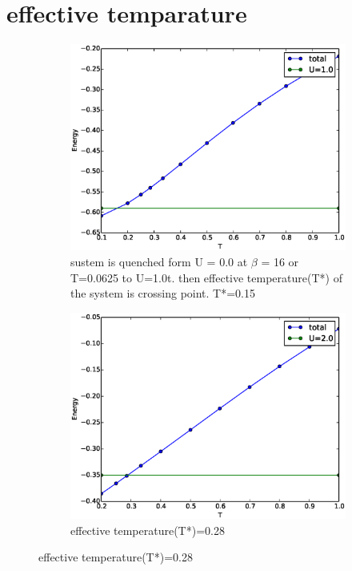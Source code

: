 \section{effective temparature}
\begin{figure}[H]
\begin{subfigure}{.5\textwidth}
 \includegraphics[width=1.1\linewidth]{bench_marking/total_energy_vs_beta_U1.eps}
  \caption{sustem is quenched form U = 0.0  at $\beta$ = 16 or T=0.0625 to U=1.0t. then effective temperature(T*) of the system is crossing point. T*=0.15 }
\end{subfigure}%
\begin{subfigure}{.5\textwidth}
  \includegraphics[width=1.1\linewidth]{bench_marking/total_energy_vs_beta_U2.eps}
  \caption{effective temperature(T*)=0.28}
\end{subfigure}
\end{figure}

